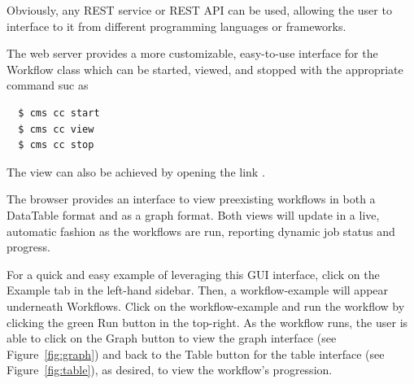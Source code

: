 \documentclass[sigplan,screen]{acmart}
\begin{document}
Obviously, any REST service or REST API can be used, allowing the user
to interface to it from different programming languages or frameworks.

The web server provides a more customizable, easy-to-use interface for
the Workflow class which can be started, viewed, and stopped with the
appropriate command suc as

{\scriptsize
\begin{verbatim}
  $ cms cc start
  $ cms cc view
  $ cms cc stop
\end{verbatim}}

The view can also be achieved by opening the 
link .

The browser provides an interface to view preexisting workflows in
both a DataTable format and as a graph format. Both views will update
in a live, automatic fashion as the workflows are run, reporting
dynamic job status and progress.

For a quick and easy example of leveraging this GUI interface, click
on the Example tab in the left-hand sidebar. Then, a workflow-example
will appear underneath Workflows. Click on the workflow-example and
run the workflow by clicking the green Run button in the top-right. As
the workflow runs, the user is able to click on the Graph button to
view the graph interface (see Figure~\ref{fig:graph}) and back to the
Table button for the table interface (see Figure~\ref{fig:table}), as
desired, to view the workflow's progression.
\end{document}
